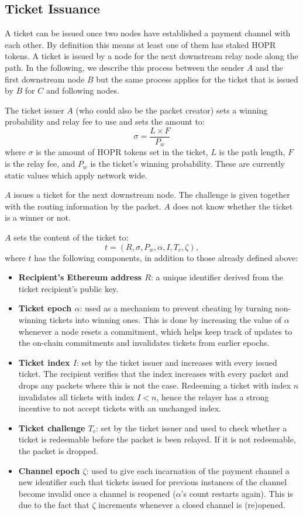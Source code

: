 \subsection{Ticket Issuance}
\label{sec:tickets:issuance}

A ticket can be issued once two nodes have established a payment channel with each other. By definition this means at least one of them has staked HOPR tokens. A ticket is issued by a node for the next downstream relay node along the path. In the following, we describe this process between the sender $A$ and the first downstream node $B$ but the same process applies for the ticket that is issued by $B$ for $C$ and following nodes.

The ticket issuer $A$ (who could also be the packet creator) sets a winning probability and relay fee to use and sets the amount to: $$\sigma=\dfrac{L\times F}{P_w}$$ where $\sigma$ is the amount of HOPR tokens set in the ticket, $L$ is the path length, $F$ is the relay fee, and $P_w$ is the ticket's winning probability. These are currently static values which apply network wide.

$A$ issues a ticket for the next downstream node. The challenge is given together with the routing information by the packet. $A$ does not know whether the ticket is a winner or not.

$A$ sets the content of the ticket to: $$t=(R,\sigma,P_w,\alpha,I,T_c,\zeta),$$ where $t$ has the following components, in addition to those already defined above:

\begin{itemize}
    \item
          \textbf{Recipient's Ethereum address $R$}: a unique identifier derived from the ticket recipient's public key.
    \item
          \textbf{Ticket epoch $\alpha$}: used as a mechanism to prevent cheating by turning non-winning tickets into winning ones. This is done by increasing the value of $\alpha$ whenever a node resets a commitment, which helps keep track of updates to the on-chain commitments and invalidates tickets from earlier epochs.
    \item
          \textbf{Ticket index $I$}: set by the ticket issuer and increases with every issued ticket. The recipient verifies that the index increases with every packet and drops any packets where this is not the case. Redeeming a ticket with index $n$ invalidates all tickets with index $I<n$, hence the relayer has a strong incentive to not accept tickets with an unchanged index.
    \item
          \textbf{Ticket challenge $T_c$}: set by the ticket issuer and used to check whether a ticket is redeemable before the packet is been relayed. If it is not redeemable, the packet is dropped.
    \item
          \textbf{Channel epoch $\zeta$}: used to give each incarnation of the payment channel a new identifier such that tickets issued for previous instances of the channel become invalid once a channel is reopened ($\alpha$'s count restarts again). This is due to the fact that $\zeta$ increments whenever a closed channel is (re)opened.
\end{itemize}

